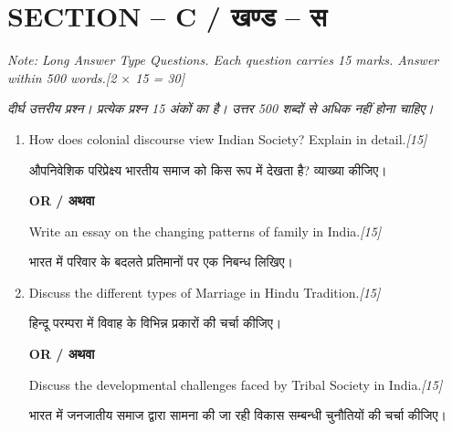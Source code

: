 \documentclass[11pt,a4paper]{article}
\newcommand{\pts}[1]{\hfill \textit{[#1]}}
\begin{document}
\bigskip

\section*{SECTION -- C / खण्ड -- स}
\noindent \textit{Note: Long Answer Type Questions. Each question carries 15 marks. Answer within 500 words.}\pts{2 $\times$ 15 = 30}

\noindent \textit{दीर्घ उत्तरीय प्रश्न। प्रत्येक प्रश्न 15 अंकों का है। उत्तर 500 शब्दों से अधिक नहीं होना चाहिए।}

\begin{enumerate}[label=\textbf{\arabic*.},leftmargin=*,start=5,itemsep=14pt]

  \item How does colonial discourse view Indian Society? Explain in detail.\pts{15}
  
  औपनिवेशिक परिप्रेक्ष्य भारतीय समाज को किस रूप में देखता है? व्याख्या कीजिए।

  \begin{center}\textbf{OR / अथवा}\end{center}

  Write an essay on the changing patterns of family in India.\pts{15}
  
  भारत में परिवार के बदलते प्रतिमानों पर एक निबन्ध लिखिए।

  \item Discuss the different types of Marriage in Hindu Tradition.\pts{15}
  
  हिन्दू परम्परा में विवाह के विभिन्न प्रकारों की चर्चा कीजिए।

  \begin{center}\textbf{OR / अथवा}\end{center}

  Discuss the developmental challenges faced by Tribal Society in India.\pts{15}
  
  भारत में जनजातीय समाज द्वारा सामना की जा रही विकास सम्बन्धी चुनौतियों की चर्चा कीजिए।

\end{enumerate}
\end{document}
